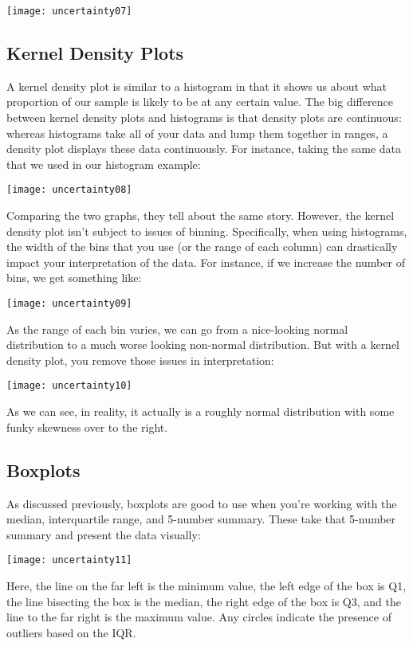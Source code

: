 \texttt{[image: uncertainty07]}

\subsection{Kernel Density Plots}
A kernel density plot is similar to a histogram in that it shows us about what proportion of our sample is likely to be at any certain value. The big difference between kernel density plots and histograms is that density plots are continuous: whereas histograms take all of your data and lump them together in ranges, a density plot displays these data continuously. For instance, taking the same data that we used in our histogram example:

\texttt{[image: uncertainty08]}

Comparing the two graphs, they tell about the same story. However, the kernel density plot isn't subject to issues of binning. Specifically, when using histograms, the width of the bins that you use (or the range of each column) can drastically impact your interpretation of the data. For instance, if we increase the number of bins, we get something like:

\texttt{[image: uncertainty09]}

As the range of each bin varies, we can go from a nice-looking normal distribution to a much worse looking non-normal distribution. But with a kernel density plot, you remove those issues in interpretation:

\texttt{[image: uncertainty10]}

As we can see, in reality, it actually is a roughly normal distribution with some funky skewness over to the right.

\subsection{Boxplots}

As discussed previously, boxplots are good to use when you're working with the median, interquartile range, and 5-number summary. These take that 5-number summary and present the data visually:

\texttt{[image: uncertainty11]}

Here, the line on the far left is the minimum value, the left edge of the box is Q1, the line bisecting the box is the median, the right edge of the box is Q3, and the line to the far right is the maximum value. Any circles indicate the presence of outliers based on the IQR.
